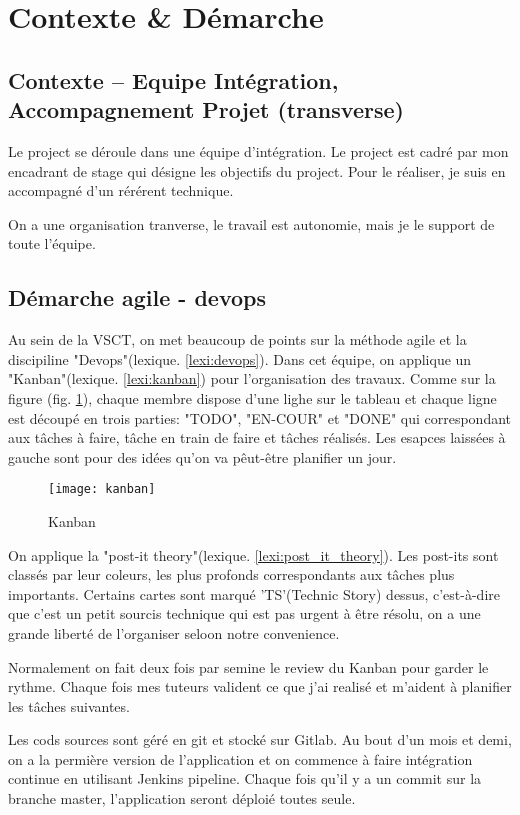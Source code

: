 \section{Contexte \& Démarche}
\subsection{Contexte -- Equipe Intégration, Accompagnement Projet (transverse)}
Le project se déroule dans une équipe d'intégration. Le project est cadré par mon encadrant de stage qui désigne les objectifs du project. Pour le réaliser, je suis en accompagné d'un rérérent technique.

On a une organisation tranverse, le travail est autonomie, mais je le support de toute l'équipe.

\subsection{Démarche agile - devops}
Au sein de la VSCT, on met beaucoup de points sur la méthode agile et la discipiline "Devops"(lexique. \ref{lexi:devops}). Dans cet équipe, on applique un "Kanban"(lexique. \ref{lexi:kanban}) pour l'organisation des travaux.  Comme sur la figure (fig. \ref{fig:kanban}), chaque membre dispose d'une lighe sur le tableau et chaque ligne est découpé en trois parties: "TODO", "EN-COUR" et "DONE" qui correspondant aux tâches à faire, tâche en train de faire et tâches réalisés. Les esapces laissées à gauche sont pour des idées qu'on va pêut-être planifier un jour.

\begin{figure}[h]
\centering
\texttt{[image: kanban]}
\caption{Kanban}
\label{fig:kanban}
\end{figure}

On applique la "post-it theory"(lexique. \ref{lexi:post_it_theory}). Les post-its sont classés par leur coleurs, les plus profonds correspondants aux tâches plus importants. Certains cartes sont marqué 'TS'(Technic Story) dessus, c'est-à-dire que c'est un petit sourcis technique qui est pas urgent à être résolu, on a une grande liberté de l'organiser seloon notre convenience.

Normalement on fait  deux fois par semine le review du Kanban pour garder le rythme. Chaque fois mes tuteurs valident ce que j'ai realisé et m'aident à planifier les tâches suivantes.

Les cods sources sont géré en git et stocké sur Gitlab. Au bout d'un mois et demi, on a la permière version de l'application et on commence à faire intégration continue en utilisant Jenkins pipeline. Chaque fois qu'il y a un commit sur la branche master, l'application seront déploié toutes seule.

\clearpage
